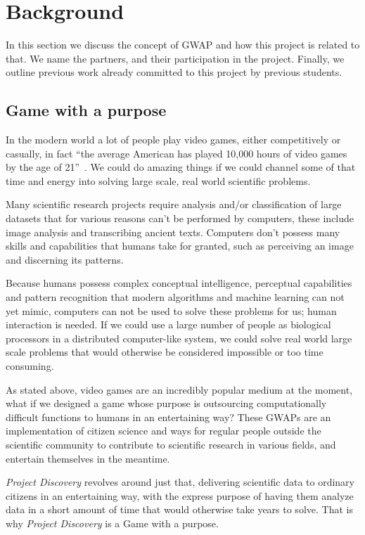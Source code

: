\section{Background}\label{sec:background}
In this section we discuss the concept of GWAP and how this project is related to that. We name the partners, and their participation in the project. Finally, we outline previous work already committed to this project by previous students.

\subsection{Game with a purpose}
In the modern world a lot of people play video games, either competitively or casually, in fact ``the average American has played 10,000 hours of video games by the age of 21''~\cite{twitch}. We could do amazing things if we could channel some of that time and energy into solving large scale, real world scientific problems.

Many scientific research projects require analysis and/or classification of large datasets that for various reasons can't be performed by computers, these include image analysis and transcribing ancient texts. Computers don't possess many skills and capabilities that humans take for granted, such as perceiving an image and discerning its patterns.

Because humans possess complex conceptual intelligence, perceptual capabilities and pattern recognition that modern algorithms and machine learning can not yet mimic, computers can not be used to solve these problems for us; human interaction is needed. If we could use a large number of people as biological processors in a distributed computer-like system, we could solve real world large scale problems that would otherwise be considered impossible or too time consuming.

As stated above, video games are an incredibly popular medium at the moment, what if we designed a game whose purpose is outsourcing computationally difficult functions to humans in an entertaining way? These GWAPs are an implementation of citizen science and ways for regular people outside the scientific community to contribute to scientific research in various fields, and entertain themselves in the meantime.

\emph{Project Discovery} revolves around just that, delivering scientific data to ordinary citizens in an entertaining way, with the express purpose of having them analyze data in a short amount of time that would otherwise take years to solve. That is why \emph{Project Discovery} is a Game with a purpose.

